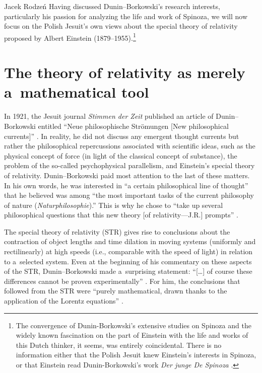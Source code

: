 \begin{artengenv}{Jacek Rodzeń}
Having discussed Dunin–Borkowski's research interests, particularly his passion for analyzing the life and work of Spinoza, we will now focus on the Polish Jesuit's own views about the special theory of relativity proposed by Albert Einstein (1879–1955).\footnote{The convergence of Dunin-Borkowski's extensive studies on Spinoza and the widely known fascination on the part of Einstein with the life and works of this Dutch thinker, it seems, was entirely coincidental. There is no information either that the Polish Jesuit knew Einstein's interests in Spinoza, or that Einstein read Dunin-Borkowski's work \textit{Der junge De Spinoza}
\parencite*[][]{dunin-borkowski_junge_1910}.%
}

\section{The theory of relativity as merely\\a~mathematical tool}
In 1921, the Jesuit journal \textit{Stimmen der Zeit} published an article of Dunin–Borkowski entitled ``Neue philosophische Strömungen [New philosophical currents]''
\parencite*[][]{dunin-borkowski_neue_1921}. %
 In reality, he did not discuss any emergent thought currents but rather the philosophical repercussions associated with scientific ideas, such as the physical concept of force (in light of the classical concept of substance), the problem of the so-called psychophysical parallelism, and Einstein's special theory of relativity. Dunin–Borkowski paid most attention to the last of these matters. In his own words, he was interested in ``a certain philosophical line of thought'' that he believed was among ``the most important tasks of the current philosophy of nature (\textit{Naturphilosophie}).'' This is why he chose to ``take up several philosophical questions that this new theory [of relativity---J.R.] prompts'' 
\parencite*[][p.211]{dunin-borkowski_neue_1921}.%


The special theory of relativity (STR) gives rise to conclusions about the contraction of object lengths and time dilation in moving systems (uniformly and rectilinearly) at high speeds (i.e., comparable with the speed of light) in relation to a~selected system. Even at the beginning of his commentary on these aspects of the STR, Dunin–Borkowski made a~surprising statement: ``[…] of course these differences cannot be proven experimentally''
\parencite*[][p.211]{dunin-borkowski_neue_1921}. %
 For him, the conclusions that followed from the STR were ``purely mathematical, drawn thanks to the application of the Lorentz equations'' 
\parencite*[][p.212]{dunin-borkowski_neue_1921}.%



\end{artengenv}
